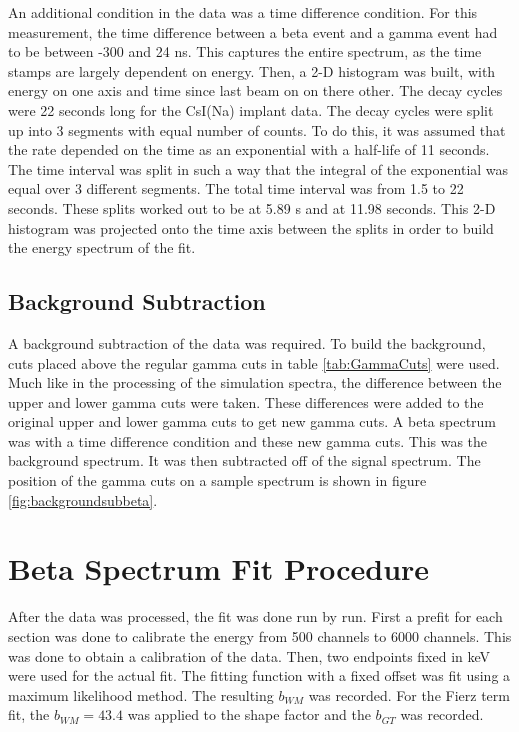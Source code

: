 \documentclass[../MaxHughesThesis.tex]{subfiles}
\begin{document}
An additional condition in the data was a time difference condition.
For this measurement, the time difference between a beta event and a gamma event had to be between -300 and 24 ns.
This captures the entire spectrum, as the time stamps are largely dependent on energy. 
Then, a 2-D histogram was built, with energy on one axis and time since last beam on on there other.
The decay cycles were 22 seconds long for the CsI(Na) implant data. 
The decay cycles were split up into 3 segments with equal number of counts.
To do this, it was assumed that the rate depended on the time as an exponential with a half-life of 11 seconds.
The time interval was split in such a way that the integral of the exponential was equal over 3 different segments.
The total time interval was from 1.5 to 22 seconds.
These splits worked out to be at 5.89 s and at 11.98 seconds. 
This 2-D histogram was projected onto the time axis between the splits in order to build the energy spectrum of the fit. 

\subsection{Background Subtraction}

A background subtraction of the data was required.
To build the background, cuts placed above the regular gamma cuts in table \ref{tab:GammaCuts} were used.
Much like in the processing of the simulation spectra, the difference between the upper and lower gamma cuts were taken.
These differences were added to the original upper and lower gamma cuts to get new gamma cuts.
A beta spectrum was with a time difference condition and these new gamma cuts.
This was the background spectrum.
It was then subtracted off of the signal spectrum. 
The position of the gamma cuts on a sample spectrum is shown in figure \ref{fig:backgroundsubbeta}.


\section{Beta Spectrum Fit Procedure}
After the data was processed, the fit was done run by run.
First a prefit for each section was done to calibrate the energy from 500 channels to 6000 channels.
This was done to obtain a calibration of the data.
Then, two endpoints fixed in keV were used for the actual fit.
The fitting function with a fixed offset was fit using a maximum likelihood method.
The resulting $b_{WM}$ was recorded.
For the Fierz term fit, the $b_{WM} = 43.4$ was applied to the shape factor and the $b_{GT}$ was recorded.
\end{document}
